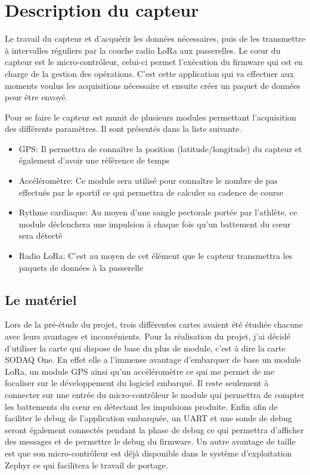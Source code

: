 

\chapter{Description du capteur}\label{ch:capteur}

Le travail du capteur et d'acquérir les données nécessaires, puis de les transmettre à intervalles réguliers par la couche radio LoRa aux passerelles. Le cœur du capteur est le micro-contrôleur, celui-ci permet l'exécution du firmware qui est en charge de la gestion des opérations. C'est cette application qui va effectuer aux moments voulus les acquisitions nécessaire et ensuite créer un paquet de données pour être  envoyé.

Pour se faire le capteur est munit de plusieurs modules permettant l'acquisition des différents paramètres. Il sont présentés dans la liste suivante.

\begin{itemize}
\item GPS: Il permettra de connaître la position (latitude/longitude) du capteur et également d'avoir une référence de temps
\item Accéléromètre: Ce module sera utilisé pour connaître le nombre de pas effectués par le sportif ce qui permettra de calculer sa cadence de course
\item Rythme cardiaque:  Au moyen d'une sangle pectorale portée par l'athlète, ce module déclenchera une impulsion à chaque fois qu'un battement du cœur sera détecté
\item Radio LoRa: C'est au moyen de cet élément que le capteur transmettra les paquets de données à la passerelle
\end{itemize}

\section{Le matériel}

Lors de la pré-étude du projet, trois différentes cartes avaient été étudiée chacune avec leurs avantages et inconvénients. Pour la réalisation du projet, j'ai décidé d'utiliser la carte qui dispose de base du plus de module, c'est à dire la carte SODAQ One. En effet elle a l'immense avantage d'embarquer de base un module LoRa, un module GPS ainsi qu'un accéléromètre ce qui me permet de me focaliser sur le développement du logiciel embarqué. Il reste seulement à connecter sur une entrée du micro-contrôleur le module qui permettra de compter les battements du cœur en détectant les impulsions produite. Enfin afin de faciliter le debug de l'application embarquée, un UART et une sonde de debug seront également connectés pendant la phase de debug ce qui permettra d'afficher des messages et de permettre le debug du firmware. Un autre avantage de taille est que son micro-contrôleur est déjà disponible dans le système d'exploitation Zephyr ce qui facilitera le travail de portage.

